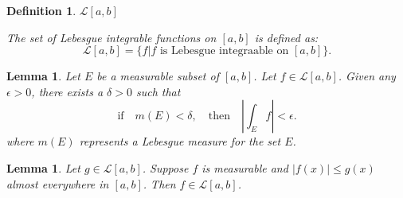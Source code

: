 \documentclass[12pt]{amsart}
\newtheorem{definition}{Definition}
\theoremstyle{plain}
\newtheorem{lemma}[thm]{Lemma}
\theoremstyle{definition}
\theoremstyle{remark}
\numberwithin{equation}{section}
\numberwithin{thm}{section}
\begin{document}
\begin{definition}
    $\mathcal{L}[a,b]$
    
The set of Lebesgue integrable functions on $[a,b]$ is defined as:
\begin{equation*}
    \mathcal{L}[a,b] = \{ f | f \text{ is Lebesgue integraable on } [a,b] \}.
\end{equation*}
\end{definition}
\begin{lemma}\label{lemma0ForDCT}
Let $E$ be a measurable subset of $[a,b]$.
Let $f \in \mathcal{L}[a,b]$. Given any $\epsilon > 0$, there exists a $\delta >0$ such that
\begin{equation*}
    \text{if} \quad m(E) < \delta, \quad \text{then} \quad |\int_E f | < \epsilon.
\end{equation*}
where $m(E)$ represents a Lebesgue measure for the set $E$.
\end{lemma}

\begin{lemma}\label{lemmaForDCT}
    Let $g \in \mathcal{L}[a,b]$. Suppose $f$ is measurable and $|f(x)| \leq g(x)$ almost everywhere in $[a,b]$. Then $f \in \mathcal{L}[a,b]$.
\end{lemma}
\end{document}
